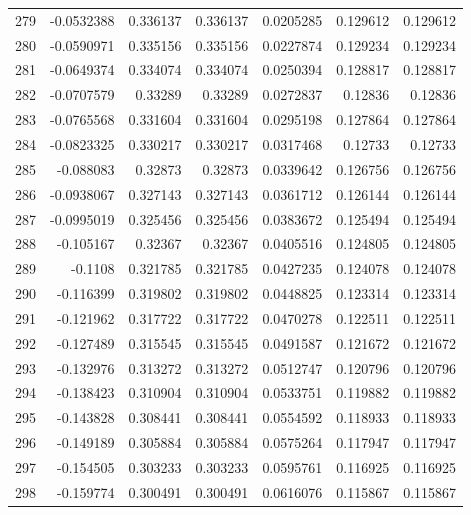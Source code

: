 \begin{tabular}{rrrrrrr}
 279 & -0.0532388   & 0.336137    & 0.336137    &  0.0205285   & 0.129612    & 0.129612    \\
 280 & -0.0590971   & 0.335156    & 0.335156    &  0.0227874   & 0.129234    & 0.129234    \\
 281 & -0.0649374   & 0.334074    & 0.334074    &  0.0250394   & 0.128817    & 0.128817    \\
 282 & -0.0707579   & 0.33289     & 0.33289     &  0.0272837   & 0.12836     & 0.12836     \\
 283 & -0.0765568   & 0.331604    & 0.331604    &  0.0295198   & 0.127864    & 0.127864    \\
 284 & -0.0823325   & 0.330217    & 0.330217    &  0.0317468   & 0.12733     & 0.12733     \\
 285 & -0.088083    & 0.32873     & 0.32873     &  0.0339642   & 0.126756    & 0.126756    \\
 286 & -0.0938067   & 0.327143    & 0.327143    &  0.0361712   & 0.126144    & 0.126144    \\
 287 & -0.0995019   & 0.325456    & 0.325456    &  0.0383672   & 0.125494    & 0.125494    \\
 288 & -0.105167    & 0.32367     & 0.32367     &  0.0405516   & 0.124805    & 0.124805    \\
 289 & -0.1108      & 0.321785    & 0.321785    &  0.0427235   & 0.124078    & 0.124078    \\
 290 & -0.116399    & 0.319802    & 0.319802    &  0.0448825   & 0.123314    & 0.123314    \\
 291 & -0.121962    & 0.317722    & 0.317722    &  0.0470278   & 0.122511    & 0.122511    \\
 292 & -0.127489    & 0.315545    & 0.315545    &  0.0491587   & 0.121672    & 0.121672    \\
 293 & -0.132976    & 0.313272    & 0.313272    &  0.0512747   & 0.120796    & 0.120796    \\
 294 & -0.138423    & 0.310904    & 0.310904    &  0.0533751   & 0.119882    & 0.119882    \\
 295 & -0.143828    & 0.308441    & 0.308441    &  0.0554592   & 0.118933    & 0.118933    \\
 296 & -0.149189    & 0.305884    & 0.305884    &  0.0575264   & 0.117947    & 0.117947    \\
 297 & -0.154505    & 0.303233    & 0.303233    &  0.0595761   & 0.116925    & 0.116925    \\
 298 & -0.159774    & 0.300491    & 0.300491    &  0.0616076   & 0.115867    & 0.115867    \\

\end{tabular}
